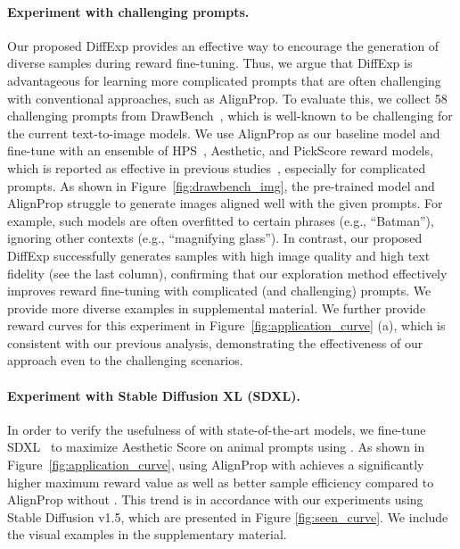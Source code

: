 \paragraph{Experiment with challenging prompts.} 
Our proposed DiffExp provides an effective way to encourage the generation of diverse samples during reward fine-tuning. Thus, we argue that DiffExp is advantageous for learning more complicated prompts that are often challenging with conventional approaches, such as AlignProp. To evaluate this, we collect 58 challenging prompts from DrawBench~\cite{imagen}, which is well-known to be challenging for the current text-to-image models. We use AlignProp as our baseline model and fine-tune with an ensemble of HPS~\cite{hps}, Aesthetic, and PickScore reward models, which is reported as effective in previous studies~\cite{draft,prdp}, especially for complicated prompts. As shown in Figure~\ref{fig:drawbench_img}, the pre-trained model and AlignProp struggle to generate images aligned well with the given prompts. For example, such models are often overfitted to certain phrases (e.g., ``Batman''), ignoring other contexts (e.g., ``magnifying glass''). In contrast, our proposed DiffExp successfully generates samples with high image quality and high text fidelity (see the last column), confirming that our exploration method effectively improves reward fine-tuning with complicated (and challenging) prompts. We provide more diverse examples in supplemental material. We further provide reward curves for this experiment in Figure~\ref{fig:application_curve} (a), which is consistent with our previous analysis, demonstrating the effectiveness of our approach even to the challenging scenarios. 


\paragraph{Experiment with Stable Diffusion XL (SDXL).}
In order to verify the usefulness of \metabbr with state-of-the-art models, we fine-tune SDXL~\citep{sdxl} to maximize Aesthetic Score on animal prompts using \metabbr. %
As shown in Figure~\ref{fig:application_curve}, using AlignProp with \metabbr achieves a significantly higher maximum reward value as well as better sample efficiency compared to AlignProp without \metabbr. This trend is in accordance with our experiments using Stable Diffusion v1.5, which are presented in Figure \ref{fig:seen_curve}. We include the visual examples in the supplementary material.



